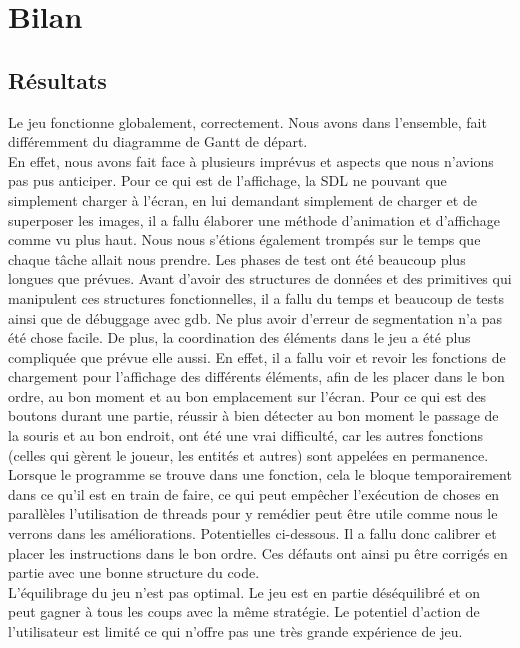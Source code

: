 \documentclass[a4paper,11pt]{article}
\begin{document}
\section{Bilan}
\subsection{Résultats}

Le jeu fonctionne globalement, correctement. Nous avons dans l'ensemble, fait différemment du diagramme de Gantt de départ.\\ En effet, nous avons fait face à plusieurs imprévus et aspects que nous n'avions pas pus anticiper. Pour ce qui est de l'affichage, la SDL ne pouvant que simplement charger à l'écran, en lui demandant simplement de charger et de superposer les images, il a fallu élaborer une méthode d'animation et d'affichage comme vu plus haut. Nous nous s'étions également trompés sur le temps que chaque tâche allait nous prendre. Les phases de test ont été beaucoup plus longues que prévues. Avant d'avoir des structures de données et des primitives qui manipulent ces structures fonctionnelles, il a fallu du temps et beaucoup de tests ainsi que de débuggage avec gdb. Ne plus avoir d'erreur de segmentation n'a pas été chose facile.
De plus, la coordination des éléments dans le jeu a été plus compliquée que prévue elle aussi. En effet, il a fallu voir et revoir les fonctions de chargement pour l'affichage des différents éléments, afin de les placer dans le bon ordre, au bon moment et au bon emplacement sur l'écran. Pour ce qui est des boutons durant une partie, réussir à bien détecter au bon moment le passage de la souris et au bon endroit, ont été une vrai difficulté, car les autres fonctions (celles qui gèrent le joueur, les entités et autres) sont appelées en permanence. Lorsque le programme se trouve dans une fonction, cela le bloque temporairement dans ce qu'il est en train de faire, ce qui peut empêcher l'exécution de choses en parallèles l'utilisation de threads pour y remédier peut être utile comme nous le verrons dans les améliorations.
Potentielles ci-dessous. Il a fallu donc calibrer et placer les instructions dans le bon ordre. Ces défauts ont ainsi pu être corrigés en partie avec une bonne structure du code. \\ L'équilibrage du jeu n'est pas optimal. Le jeu est en partie déséquilibré et on peut gagner à tous les coups avec la même stratégie. Le potentiel d'action de l'utilisateur est limité ce qui n'offre pas une très grande expérience de jeu.\\\\ 
\end{document}
